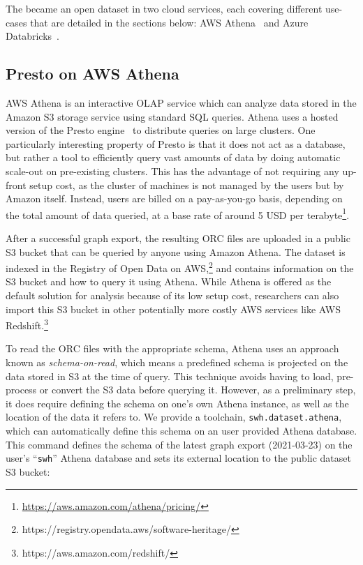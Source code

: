 The \SWHGD{} became an open dataset in two cloud services, each covering
different use-cases that are detailed in the sections below: AWS
Athena~\cite{website-amazon-athena} and Azure
Databricks~\cite{website-azure-databricks}.

\subsection{Presto on AWS Athena}

AWS Athena is an interactive OLAP service which can analyze data stored in
the Amazon S3 storage service using standard SQL queries. Athena uses a hosted
version of the Presto engine~\cite{sethi2019presto} to distribute queries on
large clusters.  One particularly interesting property of Presto is that it
does not act as a database, but rather a tool to efficiently query vast amounts
of data by doing automatic scale-out on pre-existing clusters. This has the
advantage of not requiring any up-front setup cost, as the cluster of machines
is not managed by the users but by Amazon itself. Instead, users are billed on
a pay-as-you-go basis, depending on the total amount of data queried, at a base
rate of around 5 USD per
terabyte\footnote{\url{https://aws.amazon.com/athena/pricing/}}.

After a successful graph export, the resulting ORC files are uploaded in a public
S3 bucket that can be queried by anyone using Amazon Athena. The dataset is
indexed in the Registry of Open Data on
AWS,\footnote{https://registry.opendata.aws/software-heritage/} and contains
information on the S3 bucket and how to query it using Athena. While Athena is
offered as the default solution for analysis because of its low setup cost,
researchers can also import this S3 bucket in other potentially more costly AWS
services like AWS Redshift.\footnote{https://aws.amazon.com/redshift/}

To read the ORC files with the appropriate schema, Athena uses an approach
known as \emph{schema-on-read}, which means a predefined schema is projected on
the data stored in S3 at the time of query. This technique avoids having to
load, pre-process or convert the S3 data before querying it. However, as a
preliminary step, it does require defining the schema on one's own Athena
instance, as well as the location of the data it refers to. We provide a
toolchain, \texttt{swh.dataset.athena}, which can automatically define this
schema on an user provided Athena database. This command defines the schema of
the latest graph export (2021-03-23) on the user's ``\texttt{swh}'' Athena
database and sets its external location to the public dataset S3 bucket:

